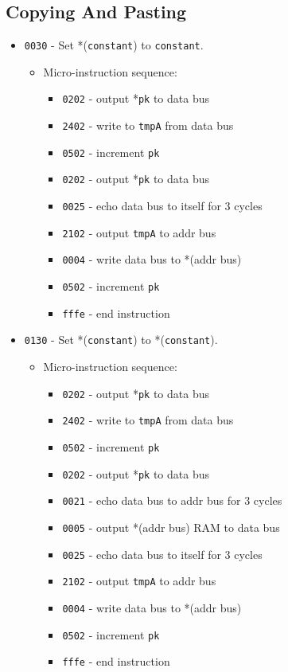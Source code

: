 \documentclass{article}
\def\pkptrout{\Verb|0202| - output *\Verb|pk| to data bus}
\def\tmpatoaddr{\Verb|2102| - output \Verb|tmpA| to addr bus}
\def\datatotmpa{\Verb|2402| - write to \Verb|tmpA| from data bus}
\def\incrementpk{\Verb|0502| - increment \Verb|pk|}
\def\writeRAM{\Verb|0004| - write data bus to *(addr bus)}
\def\readRAM{\Verb|0005| - output *(addr bus) RAM to data bus}
\def\echodataaddr{\Verb|0021| - echo data bus to addr bus for 3 cycles}
\def\echodatalong{\Verb|0025| - echo data bus to itself for 3 cycles}
\def\done{\Verb|fffe| - end instruction}
\begin{document}
\subsection{Copying And Pasting}
\begin{itemize}
    \item \Verb|0030| - Set *(\Verb|constant|) to \Verb|constant|.
    \begin{itemize}
        \item Micro-instruction sequence:
        \begin{itemize}
            \item \pkptrout
            \item \datatotmpa
            \item \incrementpk
            \item \pkptrout
            \item \echodatalong
            \item \tmpatoaddr
            \item \writeRAM
            \item \incrementpk
            \item \done
        \end{itemize}
    \end{itemize}
    
    \item \Verb|0130| - Set *(\Verb|constant|) to *(\Verb|constant|).
    \begin{itemize}
        \item Micro-instruction sequence:
        \begin{itemize}
            \item \pkptrout
            \item \datatotmpa
            \item \incrementpk
            \item \pkptrout
            \item \echodataaddr
            \item \readRAM
            \item \echodatalong
            \item \tmpatoaddr
            \item \writeRAM
            \item \incrementpk
            \item \done
        \end{itemize}
    \end{itemize}


\end{itemize}
\end{document}
